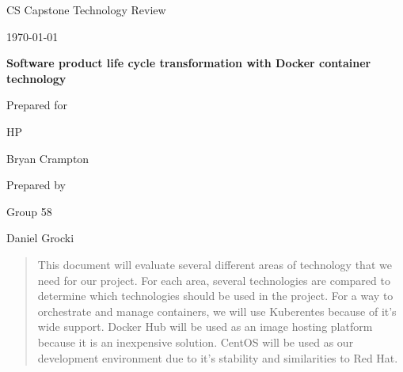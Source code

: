 \documentclass[onecolumn, draftclsnofoot,10pt, compsoc]{IEEEtran}
\def \CapstoneTeamName{		The Cleverly Named Team}
\def \CapstoneTeamNumber{		58}
\def \GroupMemberOne{			Daniel Grocki}
\def \CapstoneProjectName{		Software product life cycle transformation with Docker container technology}
\def \CapstoneSponsorCompany{	HP}
\def \CapstoneSponsorPerson{		Bryan Crampton}
\def \DocType{		%
				Technology Review
				}
\newcommand{\NameSigPair}[1]{\par
\makebox[2.75in][r]{#1} \hfil 	\makebox[3.25in]{\makebox[2.25in]{\hrulefill} \hfill		\makebox[.75in]{\hrulefill}}
\par\vspace{-12pt} \textit{\tiny\noindent
\makebox[2.75in]{} \hfil		\makebox[3.25in]{\makebox[2.25in][r]{Signature} \hfill	\makebox[.75in][r]{Date}}}}
\renewcommand{\NameSigPair}[1]{#1}
\begin{document}
\begin{titlepage}
    \begin{singlespace}
        \hfill 
        \par\vspace{.2in}
        \centering
        \scshape{
            \huge CS Capstone \DocType \par
            {\large\today}\par
            \vspace{.5in}
            \textbf{\Huge\CapstoneProjectName}\par
            \vfill
            {\large Prepared for}\par
            \Huge \CapstoneSponsorCompany\par
            \vspace{5pt}
            {\Large\NameSigPair{\CapstoneSponsorPerson}\par}
            {\large Prepared by }\par
            Group\CapstoneTeamNumber\par
            \vspace{5pt}
            {\Large
                \NameSigPair{\GroupMemberOne}\par
               
            }
            \vspace{20pt}
        }
        \begin{abstract}
        This document will evaluate several different areas of technology that we need for our project. For each area, several technologies are compared to determine which technologies should be used in the project. For a way to orchestrate and manage containers, we will use Kuberentes because of it's wide support. Docker Hub will be used as an image hosting platform because it is an inexpensive solution. CentOS will be used as our development environment due to it's stability and similarities to Red Hat.

        \end{abstract}     
    \end{singlespace}
\end{titlepage}
\newpage
{}
\tableofcontents
\clearpage
\end{document}
